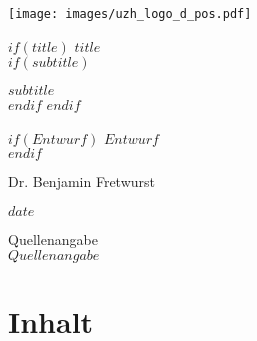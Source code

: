 \documentclass[twoside, pagesize, fontsize=11pt, dvipsnames]{scrreport} %
\begin{document}
\begin{titlepage}
\sffamily
\setlength\parindent{0pt}

\hfill \texttt{[image: images/uzh\_logo\_d\_pos.pdf]}\par

\vspace{5cm}


$if(title)$
{\bfseries \fontsize{20}{26} \selectfont $title$} \\[1ex]
$if(subtitle)$

{\fontsize{14}{14} \selectfont $subtitle$} \\[1cm]
$endif$
$endif$

$if(Entwurf)$
\vfill
{\Large $Entwurf$} \\[1cm]
$endif$

\vfill

Dr. Benjamin Fretwurst\\

\vfill
{\large }
\raggedright



$date$ \\[.5cm]
\clearpage

\vspace*{4cm}

Quellenangabe\\[.5cm]

$Quellenangabe$

\end{titlepage}


\makeatletter
{}
\makeatletter

\renewcommand{\listoftables}{\@starttoc{lot}}
\renewcommand{\tableofcontents}{\@starttoc{toc}}
\renewcommand{\listoffigures}{\@starttoc{lof}}

\renewcommand{\l@table}{\@dottedtocline{1}{1em}{3em}}
\makeatother

\clearpage
\section*{Inhalt}
\label{sec:inhalt}
\end{document}
